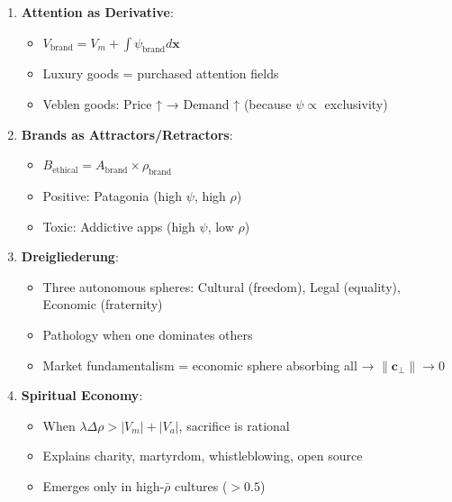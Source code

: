 \documentclass[11pt,a4paper]{article}
\theoremstyle{definition}
\theoremstyle{remark}
\newcommand{\cc}{\mathbf{c}}
\begin{document}
\begin{small}
\begin{enumerate}
\begin{mdframed}[backgroundcolor=green!10,linewidth=2pt,linecolor=green!70!black]
\begin{enumerate}[nosep]
    \item \textbf{Attention as Derivative}:
        \begin{itemize}[nosep]
            \item \(V_{\text{brand}} = V_m + \int \psi_{\text{brand}} d\mathbf{x}\)
            \item Luxury goods = purchased attention fields
            \item Veblen goods: Price ↑ → Demand ↑ (because \(\psi \propto\) exclusivity)
        \end{itemize}
    
    \item \textbf{Brands as Attractors/Retractors}:
        \begin{itemize}[nosep]
            \item \(B_{\text{ethical}} = A_{\text{brand}} \times \rho_{\text{brand}}\)
            \item Positive: Patagonia (high \(\psi\), high \(\rho\))
            \item Toxic: Addictive apps (high \(\psi\), low \(\rho\))
        \end{itemize}
    
    \item \textbf{Dreigliederung}:
        \begin{itemize}[nosep]
            \item Three autonomous spheres: Cultural (freedom), Legal (equality), Economic (fraternity)
            \item Pathology when one dominates others
            \item Market fundamentalism = economic sphere absorbing all → \(\|\cc_\perp\| \to 0\)
        \end{itemize}
    
    \item \textbf{Spiritual Economy}:
        \begin{itemize}[nosep]
            \item When \(\lambda\Delta\rho > |V_m| + |V_a|\), sacrifice is rational
            \item Explains charity, martyrdom, whistleblowing, open source
            \item Emerges only in high-\(\bar{\rho}\) cultures (\(> 0.5\))
        \end{itemize}
    

\end{enumerate}
\end{mdframed}
\end{enumerate}
\end{small}
\end{document}
